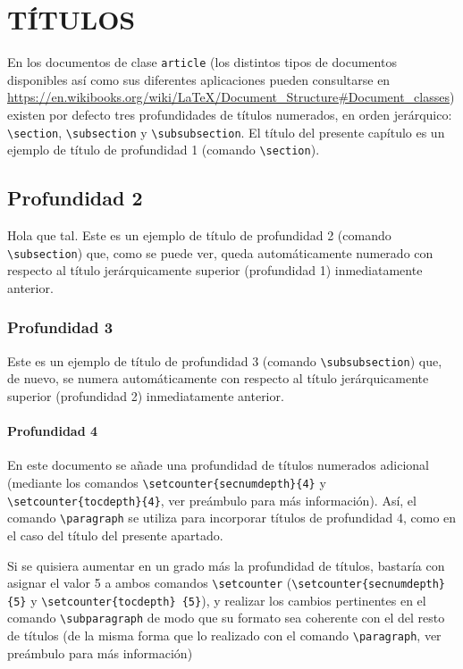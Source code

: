 
\section{TÍTULOS} \label{sec:titulos}

En los documentos de clase \texttt{article} (los distintos tipos de documentos disponibles así como sus diferentes aplicaciones pueden consultarse en \url{https://en.wikibooks.org/wiki/LaTeX/Document_Structure#Document_classes}) existen por defecto tres profundidades de títulos numerados, en orden jerárquico: \texttt{\textbackslash section}, \texttt{\textbackslash subsection} y \texttt{\textbackslash subsubsection}. El título del presente capítulo es un ejemplo de título de profundidad 1 (comando \texttt{\textbackslash section}).


\subsection{Profundidad 2}

Hola que tal. Este es un ejemplo de título de profundidad 2 (comando \texttt{\textbackslash subsection}) que, como se puede ver, queda automáticamente numerado con respecto al título jerárquicamente superior (profundidad 1) inmediatamente anterior.


\subsubsection{Profundidad 3}

Este es un ejemplo de título de profundidad 3 (comando \texttt{\textbackslash subsubsection}) que, de nuevo, se numera automáticamente con respecto al título jerárquicamente superior (profundidad 2) inmediatamente anterior.


\paragraph{Profundidad 4}

En este documento se añade una profundidad de títulos numerados adicional (mediante los comandos \texttt{\textbackslash setcounter\{secnumdepth\}\{4\}} y \texttt{\textbackslash setcounter\{tocdepth\}\{4\}}, ver preámbulo para más información). Así, el comando \texttt{\textbackslash paragraph} se utiliza para incorporar títulos de profundidad 4, como en el caso del título del presente apartado. 

Si se quisiera aumentar en un grado más la profundidad de títulos, bastaría con asignar el valor 5 a ambos comandos \texttt{\textbackslash setcounter} (\texttt{\textbackslash setcounter\{secnumdepth\}\{5\}} y \texttt{\textbackslash setcounter\{tocdepth\} \{5\}}), y realizar los cambios pertinentes en el comando \texttt{\textbackslash subparagraph} de modo que su formato sea coherente con el del resto de títulos (de la misma forma que lo realizado con el comando \texttt{\textbackslash paragraph}, ver preámbulo para más información)


